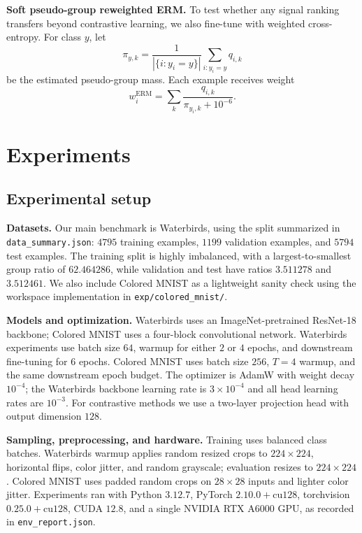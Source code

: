 \documentclass{article}
\begin{document}
\textbf{Soft pseudo-group reweighted ERM.}
To test whether any signal ranking transfers beyond contrastive learning, we also fine-tune with weighted cross-entropy. For class $y$, let
\begin{equation}
  \pi_{y,k} = \frac{1}{|\{i : y_i = y\}|} \sum_{i: y_i = y} q_{i,k}
\end{equation}
be the estimated pseudo-group mass. Each example receives weight
\begin{equation}
  w_i^{\mathrm{ERM}} = \sum_k \frac{q_{i,k}}{\pi_{y_i,k} + 10^{-6}}.
\end{equation}

\section{Experiments}
\label{sec:experiments}
\subsection{Experimental setup}
\textbf{Datasets.}
Our main benchmark is Waterbirds, using the split summarized in \texttt{data\_summary.json}: $4795$ training examples, $1199$ validation examples, and $5794$ test examples. The training split is highly imbalanced, with a largest-to-smallest group ratio of $62.464286$, while validation and test have ratios $3.511278$ and $3.512461$. We also include Colored MNIST as a lightweight sanity check using the workspace implementation in \texttt{exp/colored\_mnist/}.

\textbf{Models and optimization.}
Waterbirds uses an ImageNet-pretrained ResNet-18 backbone; Colored MNIST uses a four-block convolutional network. Waterbirds experiments use batch size $64$, warmup for either $2$ or $4$ epochs, and downstream fine-tuning for $6$ epochs. Colored MNIST uses batch size $256$, $T=4$ warmup, and the same downstream epoch budget. The optimizer is AdamW with weight decay $10^{-4}$; the Waterbirds backbone learning rate is $3 \times 10^{-4}$ and all head learning rates are $10^{-3}$. For contrastive methods we use a two-layer projection head with output dimension $128$.

\textbf{Sampling, preprocessing, and hardware.}
Training uses balanced class batches. Waterbirds warmup applies random resized crops to $224 \times 224$, horizontal flips, color jitter, and random grayscale; evaluation resizes to $224 \times 224$. Colored MNIST uses padded random crops on $28 \times 28$ inputs and lighter color jitter. Experiments ran with Python $3.12.7$, PyTorch $2.10.0+\mathrm{cu}128$, torchvision $0.25.0+\mathrm{cu}128$, CUDA $12.8$, and a single NVIDIA RTX A6000 GPU, as recorded in \texttt{env\_report.json}.
\end{document}
